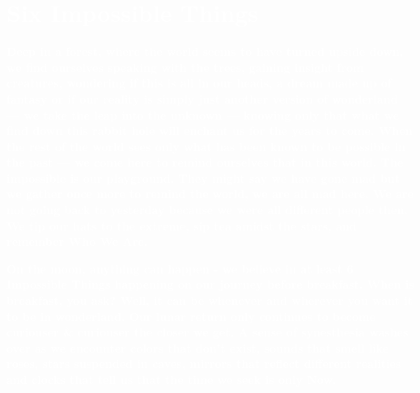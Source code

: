 
\ifisflight
  \onecolumn
\else 
  \vspace{-1cm}
\fi

\chapter*{\centering \textbf{\textcolor{white}{Six Impossible Things}}}
\label{sec:theme}


\begin{center}
\end{center}



\AddToShipoutPicture*{\ThemePic}

\ifisflight
  \vspace{1cm}
\fi

\textbf{\textcolor{white}{Deep in a forest, where the world seems to have turned upside down, we find ourselves speaking with the trees, gaining insight from creatures, wondering if this is all in our heads, a dream made up of fantasy or if our reality is simply just another version of wonderland --- we take the leap into the unknown --- knowing only that what we find down this rabbit hole will enchant us for the years to come. When the rest of the world sees only what has been known to be possible in the past --- we come here to remind ourselves that in this world. The impossible is our playground. They might say we have gone mad but we gather once more to remind the world, we are all mad here. We are not going back to yesterday because we were all different people then. We tip our hats to the extreme, sip tea amidst the stars, and remember Who We Are.}}

\textbf{\textcolor{white}{On the moon, anything can happen - we believe in at least 6 Impossible Things happening on our journey before breakfast. When is breakfast, you ask? Well, it can be whenever and wherever you want it to be in wonderland. Our lunar return only continues to become curiouser \& curiouser the closer we get. A sense of synesthesia washes over as we encounter colors that don’t exist, sounds that smell like roses, stars suspended in caves, mirrors that reflect different realities and clocks that tell us that the time we seek is only Now.}}


